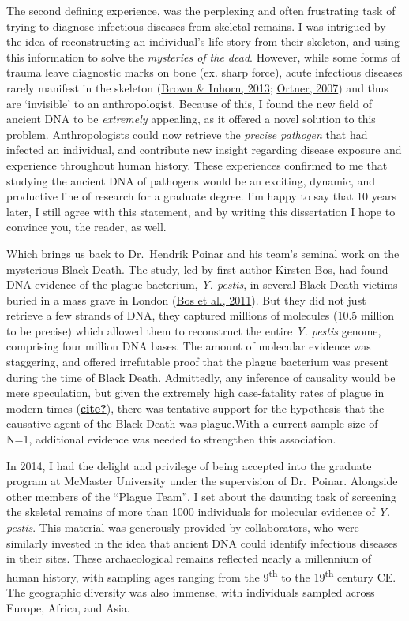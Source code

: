 \documentclass[
]{report}
\begin{document}
The second defining experience, was the perplexing and often frustrating
task of trying to diagnose infectious diseases from skeletal remains. I
was intrigued by the idea of reconstructing an individual's life story
from their skeleton, and using this information to solve the
\emph{mysteries of the dead}. However, while some forms of trauma leave
diagnostic marks on bone (ex. sharp force), acute infectious diseases
rarely manifest in the skeleton
(\protect\hyperlink{ref-brown2013AnthropologyInfectiousDisease}{Brown \&
Inhorn, 2013};
\protect\hyperlink{ref-ortner2007DifferentialDiagnosisSkeletal}{Ortner,
2007}) and thus are `invisible' to an anthropologist. Because of this, I
found the new field of ancient DNA to be \emph{extremely} appealing, as
it offered a novel solution to this problem. Anthropologists could now
retrieve the \emph{precise pathogen} that had infected an individual,
and contribute new insight regarding disease exposure and experience
throughout human history. These experiences confirmed to me that
studying the ancient DNA of pathogens would be an exciting, dynamic, and
productive line of research for a graduate degree. I'm happy to say that
10 years later, I still agree with this statement, and by writing this
dissertation I hope to convince you, the reader, as well.

Which brings us back to Dr.~Hendrik Poinar and his team's seminal work
on the mysterious Black Death. The study, led by first author Kirsten
Bos, had found DNA evidence of the plague bacterium, \emph{Y. pestis},
in several Black Death victims buried in a mass grave in London
(\protect\hyperlink{ref-bos2011DraftGenomeYersinia}{Bos et al., 2011}).
But they did not just retrieve a few strands of DNA, they captured
millions of molecules (10.5 million to be precise) which allowed them to
reconstruct the entire \emph{Y. pestis} genome, comprising four million
DNA bases. The amount of molecular evidence was staggering, and offered
irrefutable proof that the plague bacterium was present during the time
of Black Death. Admittedly, any inference of causality would be mere
speculation, but given the extremely high case-fatality rates of plague
in modern times (\protect\hyperlink{ref-cite}{\textbf{cite?}}), there
was tentative support for the hypothesis that the causative agent of the
Black Death was plague.With a current sample size of N=1, additional
evidence was needed to strengthen this association.

In 2014, I had the delight and privilege of being accepted into the
graduate program at McMaster University under the supervision of
Dr.~Poinar. Alongside other members of the ``Plague Team'', I set about
the daunting task of screening the skeletal remains of more than 1000
individuals for molecular evidence of \emph{Y. pestis}. This material
was generously provided by collaborators, who were similarly invested in
the idea that ancient DNA could identify infectious diseases in their
sites. These archaeological remains reflected nearly a millennium of
human history, with sampling ages ranging from the 9\textsuperscript{th}
to the 19\textsuperscript{th} century CE. The geographic diversity was
also immense, with individuals sampled across Europe, Africa, and Asia.
\end{document}
